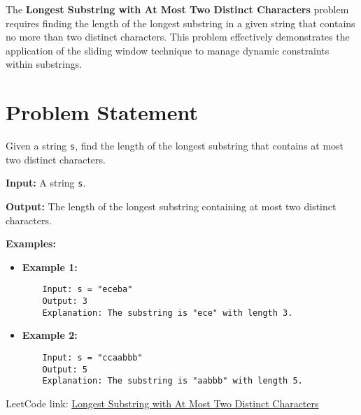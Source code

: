 
\label{chap:longest_substring_with_at_most_two_distinct_characters}

The \textbf{Longest Substring with At Most Two Distinct Characters} problem requires finding the length of the longest substring in a given string that contains no more than two distinct characters. This problem effectively demonstrates the application of the sliding window technique to manage dynamic constraints within substrings.

\section*{Problem Statement}

Given a string \texttt{s}, find the length of the longest substring that contains at most two distinct characters.

\textbf{Input:} A string \texttt{s}.

\textbf{Output:} The length of the longest substring containing at most two distinct characters.

\textbf{Examples:}

\begin{itemize}
    \item \textbf{Example 1:}
    \begin{verbatim}
    Input: s = "eceba"
    Output: 3
    Explanation: The substring is "ece" with length 3.
    \end{verbatim}

    \item \textbf{Example 2:}
    \begin{verbatim}
    Input: s = "ccaabbb"
    Output: 5
    Explanation: The substring is "aabbb" with length 5.
    \end{verbatim}
\end{itemize}

LeetCode link: \href{https://leetcode.com/problems/longest-substring-with-at-most-two-distinct-characters/}{Longest Substring with At Most Two Distinct Characters}

